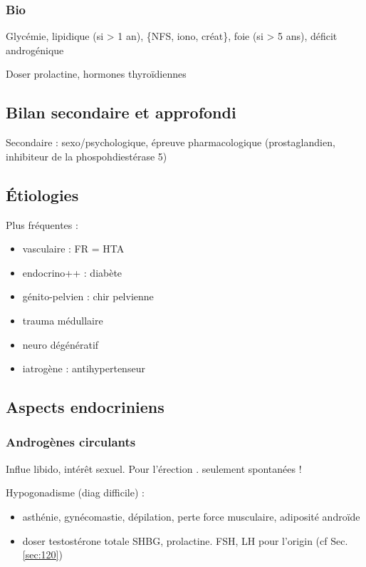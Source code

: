 \documentclass[11pt]{article}
\begin{document}
\subsubsection{Bio}
\label{sec:org9b9f286}
Glycémie, lipidique (si > 1 an), \{NFS, iono, créat\}, foie (si > 5 ans), déficit
androgénique

Doser prolactine, hormones thyroïdiennes

\subsection{Bilan secondaire et approfondi}
\label{sec:org1855c30}
Secondaire : sexo/psychologique, épreuve pharmacologique (prostaglandien,
inhibiteur de la phospohdiestérase 5)

\subsection{Étiologies}
\label{sec:org921b453}
Plus fréquentes :
\begin{itemize}
\item vasculaire : FR = HTA
\item endocrino++ : diabète
\item génito-pelvien : chir pelvienne
\item trauma médullaire
\item neuro dégénératif
\item iatrogène : antihypertenseur
\end{itemize}

\subsection{Aspects endocriniens}
\label{sec:orgdf9086a}
\subsubsection{Androgènes circulants}
\label{sec:org8a1ad73}
Influe libido, intérêt sexuel. Pour l'érection . seulement spontanées !

Hypogonadisme (diag difficile) : 
\begin{itemize}
\item asthénie, gynécomastie, dépilation, perte force musculaire, adiposité androïde
\item doser testostérone totale \textpm{} SHBG, prolactine. FSH, LH pour l'origin (cf
Sec. \ref{sec:120})
\end{itemize}
\end{document}
